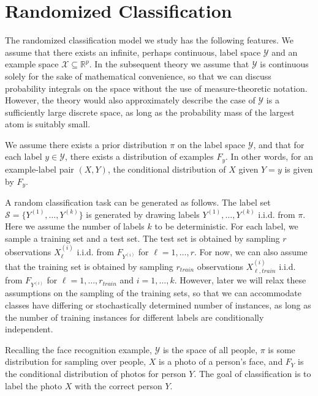 \documentclass[twoside,11pt]{article}
\begin{document}
\section{Randomized Classification}\label{sec:rc_motivation}

The randomized classification model we study has the following
features.  We assume that there exists an infinite, perhaps
continuous, label space $\mathcal{Y}$ and an example space $\mathcal{X}
\subseteq \mathbb{R}^p$.
In the subsequent theory we assume that $\mathcal{Y}$ is continuous
solely for the sake of mathematical convenience, so that we can
discuss probability integrals on the space without the use of measure-theoretic notation.
However, the theory would also approximately describe the case of
$\mathcal{Y}$ is a sufficiently large discrete space,
as long as the probability mass of the largest atom is suitably small. %

We assume there exists a prior distribution $\pi$
on the label space $\mathcal{Y}$,  and that for each label $y \in
\mathcal{Y}$, there exists a distribution of examples $F_y$. In other
words, for an example-label pair $(X, Y)$, the conditional
distribution of $X$ given $Y = y$ is given by $F_y$.

A random classification task can be generated as follows.  The label
set $\mathcal{S} = \{Y^{(1)},\hdots, Y^{(k)}\}$ is generated by
drawing labels $Y^{(1)},\hdots, Y^{(k)}$ i.i.d. from $\pi$.
Here we assume the number of labels $k$ to be deterministic.
For each label, we sample a training set and a test set.  The test set is obtained by sampling $r$
observations $X_\ell^{(i)}$ i.i.d. from $F_{Y^{(i)}}$ for $\ell = 1,\hdots,
r$.
For now, we can also assume that the training set is
obtained by sampling $r_{train}$ observations $X_{\ell, train}^{(i)}$
i.i.d. from $F_{Y^{(i)}}$ for $\ell = 1,\hdots, r_{train}$ and $i =
1,\hdots, k$.
However, later we will relax these assumptions on the sampling of the training sets,
so that we can accommodate classes have differing or stochastically determined number of instances, as long as the number of training instances for different labels are conditionally independent. %

Recalling the face recognition example,
$\mathcal{Y}$ is the space of all people,
$\pi$ is some distribution for sampling over people,
$X$ is a photo of a person's face, and
$F_Y$ is the conditional distribution of photos for person $Y$.
The goal of classification is to label the photo $X$ with the correct person $Y$.
\end{document}
